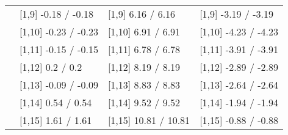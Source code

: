 \begin{table}
\begin{tabular}[t]{llll}
 & {}[1,9] -0.18  / -0.18 & {}[1,9] 6.16  / 6.16 & {}[1,9] -3.19  / -3.19\\
 & {}[1,10] -0.23  / -0.23 & {}[1,10] 6.91  / 6.91 & {}[1,10] -4.23  / -4.23\\
 & {}[1,11] -0.15  / -0.15 & {}[1,11] 6.78  / 6.78 & {}[1,11] -3.91  / -3.91\\
 & {}[1,12] 0.2  / 0.2 & {}[1,12] 8.19  / 8.19 & {}[1,12] -2.89  / -2.89\\
\addlinespace
 & {}[1,13] -0.09  / -0.09 & {}[1,13] 8.83  / 8.83 & {}[1,13] -2.64  / -2.64\\
 & {}[1,14] 0.54  / 0.54 & {}[1,14] 9.52  / 9.52 & {}[1,14] -1.94  / -1.94\\
 & {}[1,15] 1.61  / 1.61 & {}[1,15] 10.81  / 10.81 & {}[1,15] -0.88  / -0.88\\
\bottomrule
\end{tabular}
\end{table}
